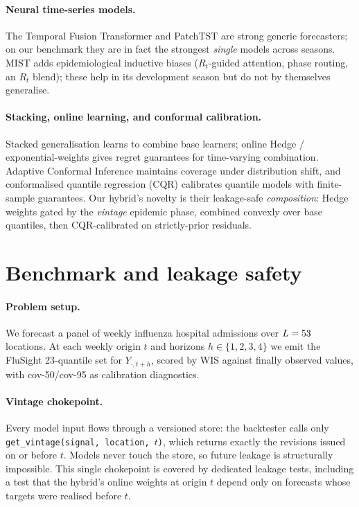 \documentclass{article}
\begin{document}
\paragraph{Neural time-series models.} The Temporal Fusion Transformer \cite{lim2021tft} and
PatchTST \cite{nie2023patchtst} are strong generic forecasters; on our benchmark they are in fact
the strongest \emph{single} models across seasons. MIST adds epidemiological inductive biases
($R_t$-guided attention, phase routing, an $R_t$ blend); these help in its development season but
do not by themselves generalise.

\paragraph{Stacking, online learning, and conformal calibration.} Stacked generalisation
\cite{wolpert1992stacked} learns to combine base learners; online Hedge / exponential-weights
\cite{cesabianchi2006prediction} gives regret guarantees for time-varying combination. Adaptive
Conformal Inference \cite{gibbs2021aci} maintains coverage under distribution shift, and
conformalised quantile regression (CQR) \cite{romano2019cqr} calibrates quantile models with
finite-sample guarantees. Our hybrid's novelty is their leakage-safe \emph{composition}: Hedge
weights gated by the \emph{vintage} epidemic phase, combined convexly over base quantiles, then
CQR-calibrated on strictly-prior residuals.

\section{Benchmark and leakage safety}

\paragraph{Problem setup.} We forecast a panel of weekly influenza hospital admissions over
$L=53{}$ locations. At each weekly origin $t$ and horizons $h\in\{1,2,3,4\}$ we emit the
FluSight 23-quantile set for $Y_{\cdot,t+h}$, scored by WIS \cite{bracher2021wis} against finally
observed values, with cov-50/cov-95 as calibration diagnostics.

\paragraph{Vintage chokepoint.} Every model input flows through a versioned store: the backtester
calls only \texttt{get\_vintage(signal, location, $t$)}, which returns exactly the revisions issued
on or before $t$. Models never touch the store, so future leakage is structurally impossible. This
single chokepoint is covered by dedicated leakage tests, including a test that the hybrid's
online weights at origin $t$ depend only on forecasts whose targets were realised before $t$.
\end{document}
